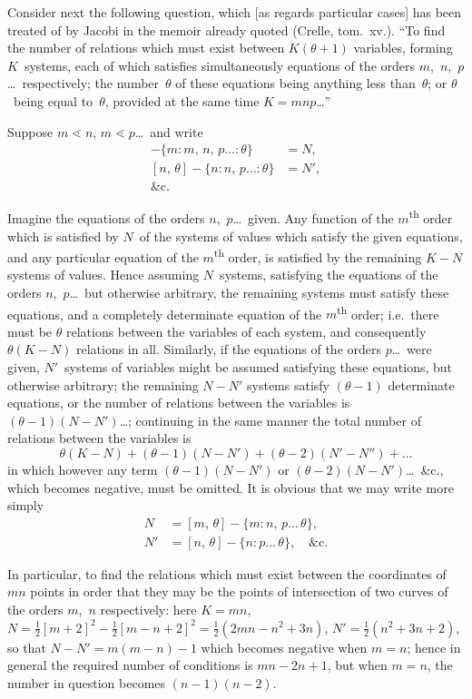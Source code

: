 \documentclass[11pt,a4paper]{article}
\begin{document}
Consider next the following question, which [as regards particular cases] has been treated of by Jacobi in the memoir already quoted (Crelle, tom.~xv.). ``To find the number of relations which must exist between $K(\theta+1)$ variables, forming $K$~systems, each of which satisfies simultaneously equations of the orders $m$,~$n$,~$p$\ldots\ respectively; the number~$\theta$ of these equations being anything less than~$\theta$; or $\theta$~being equal to~$\theta$, provided at the same time $K = mnp$\ldots''

Suppose $m \lessdot n$, $m \lessdot p$\ldots\ and write
\begin{align*}
[m,\,\theta] - \{m : m,\, n,\, p\ldots : \theta\} &= N,\\
[n,\,\theta] - \{n : n,\, p\ldots : \theta\} &= N',\\
\&\text{c.}
\end{align*}

Imagine the equations of the orders $n$,~$p$\ldots\ given. Any function of the $m$\textsuperscript{th} order which is satisfied by $N$~of the systems of values which satisfy the given equations, and any particular equation of the $m$\textsuperscript{th} order, is satisfied by the remaining $K-N$ systems of values. Hence assuming $N$~systems, satisfying the equations of the orders $n$,~$p$\ldots\ but otherwise arbitrary, the remaining systems must satisfy these equations, and a completely determinate equation of the $m$\textsuperscript{th} order; i.e.~there must be $\theta$ relations between the variables of each system, and consequently $\theta(K-N)$ relations in all. Similarly, if the equations of the orders $p$\ldots\ were given, $N'$~systems of variables might be assumed satisfying these equations, but otherwise arbitrary; the remaining $N-N'$ systems satisfy $(\theta-1)$ determinate equations, or the number of relations between the variables is $(\theta-1)(N-N')$\ldots; continuing in the same manner the total number of relations between the variables is
\[
\theta(K-N) + (\theta-1)(N-N') + (\theta-2)(N'-N'') + \ldots
\]
in which however any term $(\theta-1)(N-N')$ or $(\theta-2)(N-N')$\ldots\ \&c., which becomes negative, must be omitted. It is obvious that we may write more simply
\begin{align*}
N &= [m,\,\theta] - \{m : n,\, p\ldots\,\theta\},\\
N' &= [n,\,\theta] - \{n : p\ldots\,\theta\}, \quad \&\text{c.}
\end{align*}

\newpage
In particular, to find the relations which must exist between the coordinates of $mn$ points in order that they may be the points of intersection of two curves of the orders $m$,~$n$ respectively: here $K = mn$, $N = \frac{1}{2}[m+2]^2 - \frac{1}{2}[m-n+2]^2 = \frac{1}{2}(2mn - n^2 + 3n)$, $N' = \frac{1}{2}(n^2+3n+2)$, so that $N-N' = m(m-n)-1$ which becomes negative when $m=n$; hence in general the required number of conditions is $mn - 2n + 1$, but when $m=n$, the number in question becomes $(n-1)(n-2)$.
\end{document}
